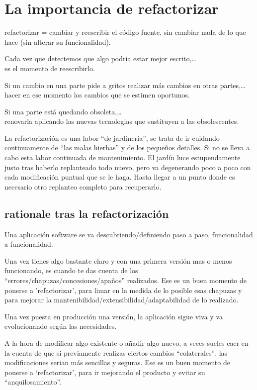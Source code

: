 \documentclass[spanish,12pt,a4paper,final,oneside]{book}
\begin{document}
\section{La importancia de refactorizar}
refactorizar = cambiar y reescribir el código fuente, sin cambiar nada de lo que hace (sin alterar su funcionalidad).

Cada vez que detectemos que algo podria estar mejor escrito,\ldots
\\es el momento de reescribirlo.

Si un cambio en una parte pide a gritos realizar más cambios en otras partes,\ldots
\\hacer en ese momento los cambios que se estimen oportunos.

Si una parte está quedando obsoleta,\ldots
\\renovarla aplicando las nuevas tecnologias que sustituyen a las obsolescentes.

La refactorización es una labor ``de jardineria'', se trata de ir cuidando continuamente de ``las malas hierbas'' y de los pequeños detalles. Si no se lleva a cabo esta labor continuada de mantenimiento. El jardín luce estupendamente justo tras haberlo replanteado todo nuevo, pero va degenerando poco a poco con cada modificación puntual que se le haga. Hasta llegar a un punto donde es necesario otro replanteo completo para recuperarlo.

\subsection{rationale tras la refactorización}
Una aplicación software se va descubriendo/definiendo paso a paso, funcionalidad a funcionalidad.

Una vez tienes algo bastante claro y con una primera versión mas o menos funcionando, es cuando te das cuenta de los ``errores/chapuzas/concesiones/apaños'' realizados.  Ese es un buen momento de ponerse a  'refactorizar', para limar en la medida de lo posible esas chapuzas y para mejorar la mantenibilidad/extensibilidad/adaptabilidad de lo realizado.

Una vez puesta en producción una versión, la aplicación sigue viva y va evolucionando según las necesidades.

A la hora de modificar algo existente o añadir algo nuevo, a veces sueles caer en la cuenta de que si previamente realizas ciertos cambios ``colaterales'', las modificaciones serian más sencillas y seguras. Ese es un buen momento de ponerse a `refactorizar', para ir mejorando el producto y evitar su ``anquilosamiento''.
\end{document}
